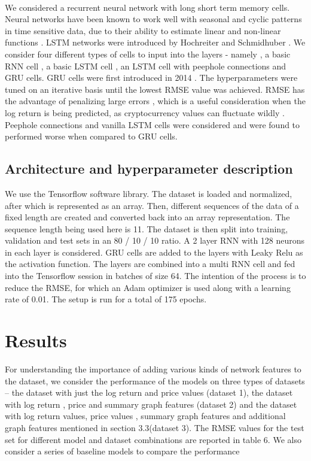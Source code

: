 \documentclass[12pt]{article}%
\begin{document}
\paragraph{}We considered a recurrent neural network with long short term memory cells. Neural networks have been known to work well with seasonal and cyclic patterns in time sensitive data, due to their ability to estimate linear and non-linear functions \cite{43}. LSTM networks were introduced by Hochreiter and Schmidhuber \cite{42}. We consider four different types of cells to input into the layers - namely , a basic RNN cell , a basic LSTM cell , an LSTM cell with peephole connections and GRU cells. GRU cells were first introduced in 2014 \cite{34}. The hyperparameters were tuned on an iterative basis until the lowest RMSE value was achieved. RMSE has the advantage of penalizing large errors \cite{36}, which is a useful consideration when the log return is being predicted, as cryptocurrency values can fluctuate wildly \cite{37}. Peephole connections \cite{38} and vanilla LSTM cells were considered and were found to performed worse when compared to GRU cells. 
  
\subsection{Architecture and hyperparameter description}
We use the Tensorflow \cite{40} software library. The dataset is loaded and normalized, after which is represented as an array. Then, different sequences of the data of a fixed length are created and converted back into an array representation. The sequence length being used here is 11. The dataset is then split into training, validation and test sets in an 80 / 10 / 10 ratio. A 2 layer RNN with 128 neurons in each layer is considered. GRU cells are added to the layers with Leaky Relu as the activation function. The layers are combined into a multi RNN cell and fed into the Tensorflow session in batches of size 64. The intention of the process is to reduce the RMSE, for which an Adam optimizer \cite{39} is used along with a learning rate of 0.01. The setup is run for a total of 175 epochs.

\section{Results}
For understanding the importance of adding various kinds of network features to the dataset, we consider the performance of the models on three types of datasets – the dataset with just the log return and price values (dataset 1), the dataset with log return , price and summary graph features (dataset 2) and the dataset with log return values, price values , summary graph features and additional graph features mentioned in section 3.3(dataset 3). The RMSE values for the test set for different model and dataset combinations are reported in table 6. We also consider a series of baseline models to compare the performance  
\end{document}
